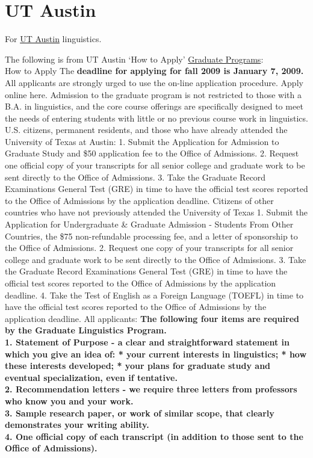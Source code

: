 \documentclass[11pt]{article}
\begin{document}
\section{UT Austin}
For \href{http://www.utexas.edu/cola/depts/linguistics/main/}{UT Austin} linguistics.

The following is from UT Austin `How to Apply' \href{http://www.utexas.edu/cola/depts/linguistics/graduate_programs/apply/}{Graduate Programs}:\\


How to Apply
The \textbf{deadline for applying for fall 2009 is January 7, 2009.}
All applicants are strongly urged to use the on-line application procedure. Apply online here.
Admission to the graduate program is not restricted to those with a B.A. in linguistics, and the core course offerings are specifically designed to meet the needs of entering students with little or no previous course work in linguistics.
U.S. citizens, permanent residents, and those who have already attended the University of Texas at Austin:
   1. Submit the Application for Admission to Graduate Study and \$50 application fee to the Office of Admissions.
   2. Request one official copy of your transcripts for all senior college and graduate work to be sent directly to the Office of Admissions.
   3. Take the Graduate Record Examinations General Test (GRE) in time to have the official test scores reported to the Office of Admissions by the application deadline. 
Citizens of other countries who have not previously attended the University of Texas
   1. Submit the Application for Undergraduate \& Graduate Admission - Students From Other Countries, the \$75 non-refundable processing fee, and a letter of sponsorship to the Office of Admissions.
   2. Request one copy of your transcripts for all senior college and graduate work to be sent directly to the Office of Admissions.
   3. Take the Graduate Record Examinations General Test (GRE) in time to have the official test scores reported to the Office of Admissions by the application deadline.
   4. Take the Test of English as a Foreign Language (TOEFL) in time to have the official test scores reported to the Office of Admissions by the application deadline.
All applicants:
\textbf{The following four items are required by the Graduate Linguistics Program.\\
   1. Statement of Purpose - a clear and straightforward statement in which you give an idea of:
          * your current interests in linguistics;
          * how these interests developed;
          * your plans for graduate study and eventual specialization, even if tentative.\\ 
   2. Recommendation letters - we require three letters from professors who know you and your work.\\
   3. Sample research paper, or work of similar scope, that clearly demonstrates your writing ability.\\
   4. One official copy of each transcript (in addition to those sent to the Office of Admissions).}\\ 
\end{document}
